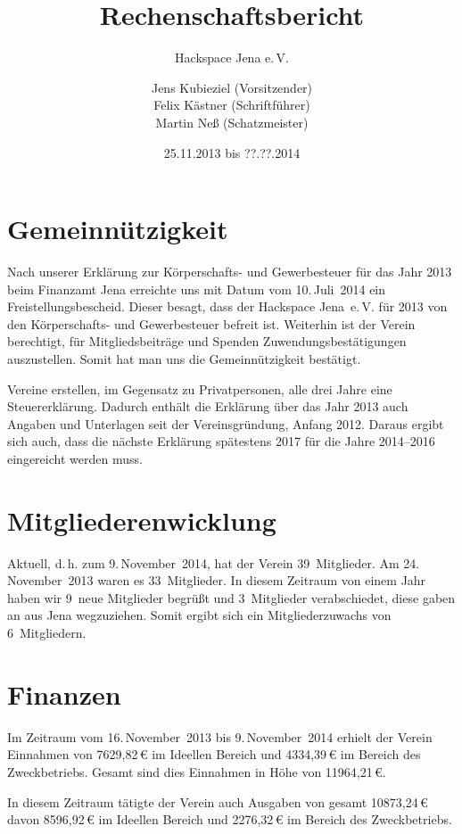 \documentclass[10pt,DIV16]{scrartcl}
\title{Rechenschaftsbericht}
\subtitle{Hackspace Jena e.\,V.}
\author{%
	Jens Kubieziel (Vorsitzender)\\
    Felix Kästner (Schriftführer)\\
	Martin Neß (Schatzmeister)
}
\date{25.11.2013 bis ??.??.2014}
\begin{document}
\maketitle{}

\tableofcontents{}

\newpage{}

\section{Gemeinnützigkeit}

Nach unserer Erklärung zur Körperschafts- und Gewerbesteuer für das Jahr 2013 beim Finanzamt Jena
erreichte uns mit Datum  vom 10.\,Juli~2014 ein Freistellungsbescheid.
Dieser besagt, dass der Hackspace Jena~e.\,V. für 2013 von den Körperschafts- und Gewerbesteuer befreit ist. Weiterhin ist der Verein berechtigt, für Mitgliedsbeiträge und Spenden Zuwendungsbestätigungen auszustellen.
Somit hat man uns die Gemeinnützigkeit bestätigt.

Vereine erstellen, im Gegensatz zu Privatpersonen, alle drei Jahre eine Steuererklärung.
Dadurch enthält die Erklärung über das Jahr 2013 auch Angaben und Unterlagen seit der Vereinsgründung, Anfang 2012.
Daraus ergibt sich auch, dass die nächste Erklärung spätestens 2017 für die Jahre 2014--2016 eingereicht werden muss.

\section{Mitgliederenwicklung}

Aktuell, d.\,h. zum 9.\,November~2014, hat der Verein 39~Mitglieder. Am 24.\,November~2013 waren es 33~Mitglieder.
In diesem Zeitraum von einem Jahr haben wir 9~neue Mitglieder begrüßt und 3~Mitglieder verabschiedet, diese gaben an aus Jena wegzuziehen.
Somit ergibt sich ein Mitgliederzuwachs von 6~Mitgliedern.

\section{Finanzen}

Im Zeitraum vom 16.\,November~2013 bis 9.\,November~2014 erhielt der Verein Einnahmen von 7629,82\,\euro{} im Ideellen Bereich und 4334,39\,\euro{} im Bereich des Zweckbetriebs.
Gesamt sind dies Einnahmen in Höhe von 11964,21\,\euro{}.

In diesem Zeitraum tätigte der Verein auch Ausgaben von gesamt 10873,24\,\euro{} davon 8596,92\,\euro{} im Ideellen Bereich und 2276,32\,\euro{} im Bereich des Zweckbetriebs.
\end{document}
